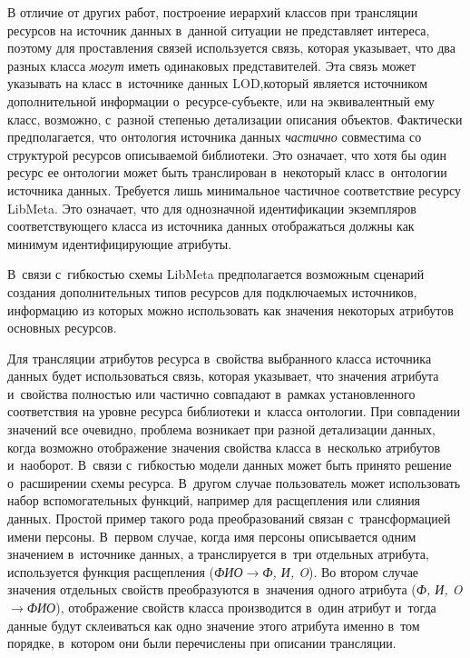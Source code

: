 \begin{multicols}{2}
    В отличие от других работ, построение иерархий классов при 
трансляции ресурсов на источник данных в~данной ситуации не представляет 
интереса, поэтому для проставления связей используется связь, которая 
указывает, что два разных класса \textit{могут} иметь одинаковых 
представителей. Эта связь может указывать на класс в~источнике данных 
LOD,\linebreak который является источником дополнительной информа\-ции  
о~ре\-сур\-се-субъ\-ек\-те, или на эквивалентный ему класс, возможно, 
с~разной степенью детализации описания объектов. Фактически 
предполагается, что онтология источника данных \textit{час\-тич\-но} 
совместима со структурой ресурсов описываемой библиотеки. Это означает, 
что хотя бы один ресурс ее онтологии может быть транслирован в~некоторый 
класс в~онтологии источника данных. Требуется лишь минимальное 
частичное соответствие ресурсу LibMeta. Это означает, что для однозначной 
идентификации экземпляров соответствующего класса из источника данных 
отображаться должны как минимум идентифицирующие атри\-буты. 

    
    В~связи с~гибкостью схемы LibMeta предполагается возможным 
сценарий создания дополнительных типов ресурсов для подключаемых 
источников, информацию из которых можно использовать как значения 
некоторых атрибутов основных ресурсов.
{

}
    
    Для трансляции атрибутов ресурса в~свойства выбранного класса 
источника данных будет использоваться связь, которая указывает, что 
значения атрибута и~свойства полностью или частично совпадают в~рамках 
установленного соответствия на уровне ресурса библиотеки и~класса 
онтологии. При совпадении значений все очевидно, проблема возникает при 
разной детализации данных, когда возможно отображение значения свойства 
класса в~несколько атрибутов и~наоборот. В~связи с~гиб\-костью модели 
данных может быть принято решение о~расширении схемы ресурса. 
В~другом случае пользователь может использовать набор вспомогательных 
функций, например для расщепления или слияния данных. Простой пример 
такого рода преобразований связан с~трансформацией имени персоны. 
В~первом случае, когда имя персоны описывается одним значением 
в~источнике данных, а транслируется в~три отдельных атрибута, 
используется функция расщепления (\textit{ФИО}\;$\to$\;\textit{Ф, И, O}). Во 
втором случае значения отдельных свойств преобразуются в~значения одного 
атрибута (\textit{Ф, И, O}\;$\to$\;\textit{ФИО}), отображение свойств класса 
производится в~один атрибут и~тогда данные будут склеиваться как одно 
значение этого атрибута именно в~том порядке, в~котором они были 
перечислены при описании трансляции.
    

\end{multicols}
